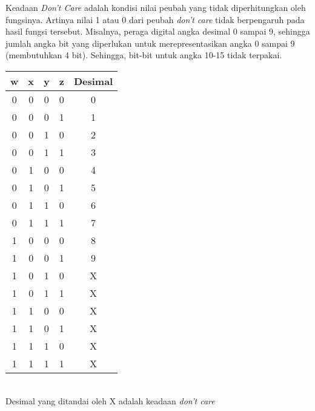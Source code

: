 \documentclass[11pt]{article}
\theoremstyle{definitionstyle}
\theoremstyle{theoremstyle}
\theoremstyle{examplestyle}
\begin{document}
Keadaan \textit{Don't Care} adalah kondisi nilai peubah yang tidak diperhitungkan oleh fungsinya. 
Artinya nilai 1 atau 0 dari peubah \textit{don't care} tidak berpengaruh pada hasil fungsi tersebut.
Misalnya, peraga digital angka desimal 0 sampai 9, sehingga jumlah angka bit yang diperlukan untuk merepresentasikan angka 0 sampai 9 (membutuhkan 4 bit).
Sehingga, bit-bit untuk angka 10-15 tidak terpakai.
\begin{center}
    \begin{tabular}{|c|c|c|c|c|}
        \hline
        \textbf{w} & \textbf{x} & \textbf{y} & \textbf{z} & \textbf{Desimal} \\ \hline
        0          & 0          & 0          & 0          & 0                \\ \hline
        0          & 0          & 0          & 1          & 1                \\ \hline
        0          & 0          & 1          & 0          & 2                \\ \hline
        0          & 0          & 1          & 1          & 3                \\ \hline
        0          & 1          & 0          & 0          & 4                \\ \hline
        0          & 1          & 0          & 1          & 5                \\ \hline
        0          & 1          & 1          & 0          & 6                \\ \hline
        0          & 1          & 1          & 1          & 7                \\ \hline
        1          & 0          & 0          & 0          & 8                \\ \hline
        1          & 0          & 0          & 1          & 9                \\ \hline
        1          & 0          & 1          & 0          & X                \\ \hline
        1          & 0          & 1          & 1          & X                \\ \hline
        1          & 1          & 0          & 0          & X                \\ \hline
        1          & 1          & 0          & 1          & X                \\ \hline
        1          & 1          & 1          & 0          & X                \\ \hline
        1          & 1          & 1          & 1          & X                \\ \hline
    \end{tabular} \\
Desimal yang ditandai oleh X adalah keadaan \textit{don't care} \\
\end{center}    
\end{document}
